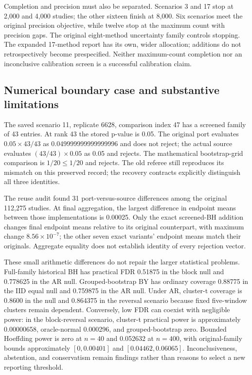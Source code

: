 Completion and precision must also be separated. Scenarios 3 and 17 stop
at 2,000 and 4,000 studies; the other sixteen finish at 8,000. Six scenarios
meet the original precision objective, while twelve stop at the maximum
count with precision gaps. The original eight-method uncertainty family
controls stopping. The expanded 17-method report has its own, wider
allocation; additions do not retrospectively become prespecified. Neither
maximum-count completion nor an inconclusive calibration screen is a
successful calibration claim.

\subsection{Numerical boundary case and substantive limitations}
The saved scenario 11, replicate 6628, comparison index 47 has a screened
family of 43 entries. At rank 43 the stored p-value is 0.05. The original
port evaluates $0.05\times43/43$ as 0.049999999999999996 and does not reject;
the actual source evaluates $(43/43)\times0.05$ as 0.05 and rejects.
The mathematical bootstrap-grid comparison is $1/20\leq1/20$ and rejects.
The old referee still reproduces its mismatch on this preserved record;
the recovery contracts explicitly distinguish all three identities.

The reuse audit found 31 port-versus-source differences among the original
112,275 studies. At final aggregation, the largest difference in endpoint
means between those implementations is 0.00025. Only the exact screened-BH
addition changes final endpoint means relative to its original counterpart,
with maximum change $8.56\times10^{-7}$; the other seven exact variants'
endpoint means match their originals. Aggregate equality does not establish
identity of every rejection vector.

These small arithmetic differences do not repair the larger statistical
problems. Full-family historical BH has practical FDR 0.51875 in the block
null and 0.778625 in the AR null. Grouped-bootstrap BY has ordinary coverage
0.88775 in the IID equal null and 0.759875 in the AR null. Under AR,
cluster-t coverage is 0.8600 in the null and 0.864375 in the reversal
scenario because fixed five-window clusters remain dependent. Conversely,
low FDR can coexist with negligible power: in the block-reversal scenario,
cluster-t practical power is approximately 0.00000658, oracle-normal
0.000296, and grouped-bootstrap zero. Bounded Hoeffding power is zero at
$n=40$ and 0.052632 at $n=400$, with original-family bounds approximately
$[0,0.00401]$ and $[0.04462,0.06065]$. Inconclusiveness, abstention, and
conservatism remain findings rather than reasons to select a new reporting
threshold.

